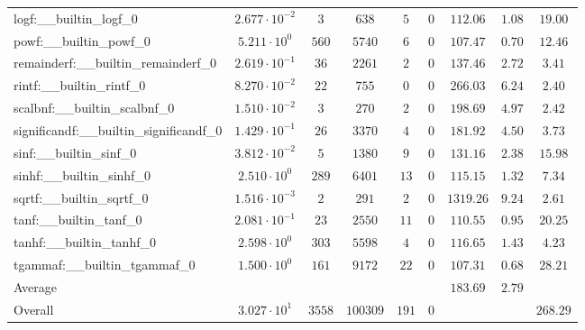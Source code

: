 \begin{tabular}{|l|c|c|c|c|c|c|c|c|}
logf:\_\_builtin\_logf\_0                 & $ 2.677 \cdot 10^{-2} $ & $ 3      $ & $ 638    $ & $ 5   $ & $ 0   $ & $ 112.06      $ & $ 1.08    $ & $ 19.00   $ \\
powf:\_\_builtin\_powf\_0                 & $ 5.211 \cdot 10^{0}  $ & $ 560    $ & $ 5740   $ & $ 6   $ & $ 0   $ & $ 107.47      $ & $ 0.70    $ & $ 12.46   $ \\
remainderf:\_\_builtin\_remainderf\_0     & $ 2.619 \cdot 10^{-1} $ & $ 36     $ & $ 2261   $ & $ 2   $ & $ 0   $ & $ 137.46      $ & $ 2.72    $ & $ 3.41    $ \\
rintf:\_\_builtin\_rintf\_0               & $ 8.270 \cdot 10^{-2} $ & $ 22     $ & $ 755    $ & $ 0   $ & $ 0   $ & $ 266.03      $ & $ 6.24    $ & $ 2.40    $ \\
scalbnf:\_\_builtin\_scalbnf\_0           & $ 1.510 \cdot 10^{-2} $ & $ 3      $ & $ 270    $ & $ 2   $ & $ 0   $ & $ 198.69      $ & $ 4.97    $ & $ 2.42    $ \\
significandf:\_\_builtin\_significandf\_0 & $ 1.429 \cdot 10^{-1} $ & $ 26     $ & $ 3370   $ & $ 4   $ & $ 0   $ & $ 181.92      $ & $ 4.50    $ & $ 3.73    $ \\
sinf:\_\_builtin\_sinf\_0                 & $ 3.812 \cdot 10^{-2} $ & $ 5      $ & $ 1380   $ & $ 9   $ & $ 0   $ & $ 131.16      $ & $ 2.38    $ & $ 15.98   $ \\
sinhf:\_\_builtin\_sinhf\_0               & $ 2.510 \cdot 10^{0}  $ & $ 289    $ & $ 6401   $ & $ 13  $ & $ 0   $ & $ 115.15      $ & $ 1.32    $ & $ 7.34    $ \\
sqrtf:\_\_builtin\_sqrtf\_0               & $ 1.516 \cdot 10^{-3} $ & $ 2      $ & $ 291    $ & $ 2   $ & $ 0   $ & $ 1319.26     $ & $ 9.24    $ & $ 2.61    $ \\
tanf:\_\_builtin\_tanf\_0                 & $ 2.081 \cdot 10^{-1} $ & $ 23     $ & $ 2550   $ & $ 11  $ & $ 0   $ & $ 110.55      $ & $ 0.95    $ & $ 20.25   $ \\
tanhf:\_\_builtin\_tanhf\_0               & $ 2.598 \cdot 10^{0}  $ & $ 303    $ & $ 5598   $ & $ 4   $ & $ 0   $ & $ 116.65      $ & $ 1.43    $ & $ 4.23    $ \\
tgammaf:\_\_builtin\_tgammaf\_0           & $ 1.500 \cdot 10^{0}  $ & $ 161    $ & $ 9172   $ & $ 22  $ & $ 0   $ & $ 107.31      $ & $ 0.68    $ & $ 28.21   $ \\
\hline
Average                                   & $                     $ & $        $ & $        $ & $     $ & $     $ & $ 183.69      $ & $ 2.79    $ & $         $ \\
\hline
Overall                                   & $ 3.027 \cdot 10^{1}  $ & $ 3558   $ & $ 100309 $ & $ 191 $ & $ 0   $ & $             $ & $         $ & $ 268.29  $ \\
\hline
\end{tabular}
